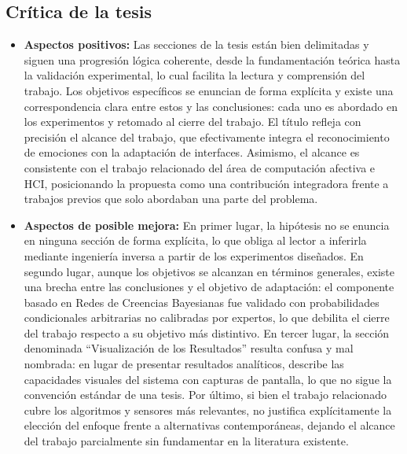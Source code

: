 \subsection{Crítica de la tesis}
\begin{itemize}
    \item \textbf{Aspectos positivos:} Las secciones de la tesis están bien delimitadas y siguen una progresión lógica coherente, desde la fundamentación teórica hasta la validación experimental, lo cual facilita la lectura y comprensión del trabajo. Los objetivos específicos se enuncian de forma explícita y existe una correspondencia clara entre estos y las conclusiones: cada uno es abordado en los experimentos y retomado al cierre del trabajo. El título refleja con precisión el alcance del trabajo, que efectivamente integra el reconocimiento de emociones con la adaptación de interfaces. Asimismo, el alcance es consistente con el trabajo relacionado del área de computación afectiva e HCI, posicionando la propuesta como una contribución integradora frente a trabajos previos que solo abordaban una parte del problema.
    \item \textbf{Aspectos de posible mejora:} En primer lugar, la hipótesis no se enuncia en ninguna sección de forma explícita, lo que obliga al lector a inferirla mediante ingeniería inversa a partir de los experimentos diseñados. En segundo lugar, aunque los objetivos se alcanzan en términos generales, existe una brecha entre las conclusiones y el objetivo de adaptación: el componente basado en Redes de Creencias Bayesianas fue validado con probabilidades condicionales arbitrarias no calibradas por expertos, lo que debilita el cierre del trabajo respecto a su objetivo más distintivo. En tercer lugar, la sección denominada ``Visualización de los Resultados'' resulta confusa y mal nombrada: en lugar de presentar resultados analíticos, describe las capacidades visuales del sistema con capturas de pantalla, lo que no sigue la convención estándar de una tesis. Por último, si bien el trabajo relacionado cubre los algoritmos y sensores más relevantes, no justifica explícitamente la elección del enfoque frente a alternativas contemporáneas, dejando el alcance del trabajo parcialmente sin fundamentar en la literatura existente.
\end{itemize}
